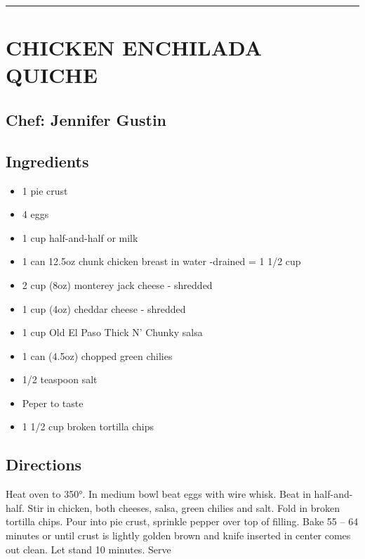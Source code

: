 \documentclass[
]{book}
\providecommand{\tightlist}{%
  \setlength{\itemsep}{0pt}\setlength{\parskip}{0pt}}
\begin{document}
\begin{center}\rule{0.5\linewidth}{0.5pt}\end{center}

\hypertarget{chicken-enchilada-quiche}{%
\section*{CHICKEN ENCHILADA QUICHE}\label{chicken-enchilada-quiche}}


\hypertarget{chef-jennifer-gustin-8}{%
\subsection*{Chef: Jennifer Gustin}\label{chef-jennifer-gustin-8}}


\hypertarget{ingredients-48}{%
\subsection*{Ingredients}\label{ingredients-48}}


\begin{itemize}
\tightlist
\item
  1 pie crust
\item
  4 eggs
\item
  1 cup half-and-half or milk
\item
  1 can 12.5oz chunk chicken breast in water -drained = 1 1/2 cup
\item
  2 cup (8oz) monterey jack cheese - shredded
\item
  1 cup (4oz) cheddar cheese - shredded
\item
  1 cup Old El Paso Thick N' Chunky salsa
\item
  1 can (4.5oz) chopped green chilies
\item
  1/2 teaspoon salt
\item
  Peper to taste
\item
  1 1/2 cup broken tortilla chips
\end{itemize}

\hypertarget{directions-48}{%
\subsection*{Directions}\label{directions-48}}


Heat oven to 350°. In medium bowl beat eggs with wire whisk. Beat in half-and-half. Stir in chicken,
both cheeses, salsa, green chilies and salt. Fold in broken tortilla chips.
Pour into pie crust, sprinkle pepper over top of filling. Bake 55 -- 64 minutes or until crust is lightly
golden brown and knife inserted in center comes out clean. Let stand 10 minutes. Serve
\end{document}
